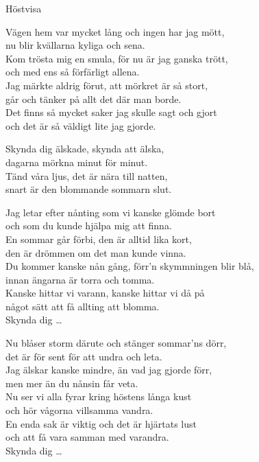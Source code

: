 \begin{song}{Höstvisa}
	
	
	

    \showversenumber	
	Vägen hem var mycket lång och ingen har jag mött,\\
	nu blir kvällarna kyliga och sena.\\
	Kom trösta mig en smula, för nu är jag ganska trött,\\
	och med ens så förfärligt allena.\\
	Jag märkte aldrig förut, att mörkret är så stort,\\
	går och tänker på allt det där man borde.\\
	Det finns så mycket saker jag skulle sagt och gjort\\
	och det är så väldigt lite jag gjorde.
	
	Skynda dig älskade, skynda att älska,\\
	dagarna mörkna minut för minut.\\
	Tänd våra ljus, det är nära till natten,\\
	snart är den blommande sommarn slut.
	
    \showversenumber
	Jag letar efter nånting som vi kanske glömde bort\\
	och som du kunde hjälpa mig att finna.\\
	En sommar går förbi, den är alltid lika kort,\\
	den är drömmen om det man kunde vinna.\\
	Du kommer kanske nån gång, förr'n skymmningen blir blå,\\
	innan ängarna är torra och tomma.\\
	Kanske hittar vi varann, kanske hittar vi då på\\
	något sätt att få allting att blomma.\\
	Skynda dig \ldots{}
	
    \showversenumber
	Nu blåser storm därute och stänger sommar'ns dörr,\\
	det är för sent för att undra och leta.\\
	Jag älskar kanske mindre, än vad jag gjorde förr,\\
	men mer än du nånsin får veta.\\
	Nu ser vi alla fyrar kring höstens långa kust\\
	och hör vågorna villsamma vandra.\\
	En enda sak är viktig och det är hjärtats lust\\
	och att få vara samman med varandra.\\
	Skynda dig \ldots{}
	
\end{song}
